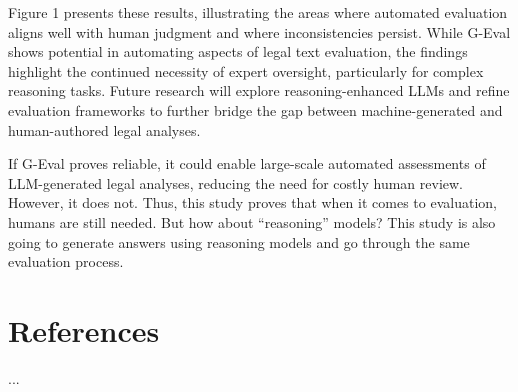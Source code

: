 \documentclass[a4paper,12pt]{article}
\begin{document}
Figure 1 presents these results, illustrating the areas where automated evaluation aligns well with human judgment and where inconsistencies persist. While G-Eval shows potential in automating aspects of legal text evaluation, the findings highlight the continued necessity of expert oversight, particularly for complex reasoning tasks. Future research will explore reasoning-enhanced LLMs and refine evaluation frameworks to further bridge the gap between machine-generated and human-authored legal analyses.

If G-Eval proves reliable, it could enable large-scale automated assessments of LLM-generated legal analyses, reducing the need for costly human review. However, it does not. Thus, this study proves that when it comes to evaluation, humans are still needed. But how about ``reasoning'' models? This study is also going to generate answers using reasoning models and go through the same evaluation process.

\section*{References}
...

\end{document}
